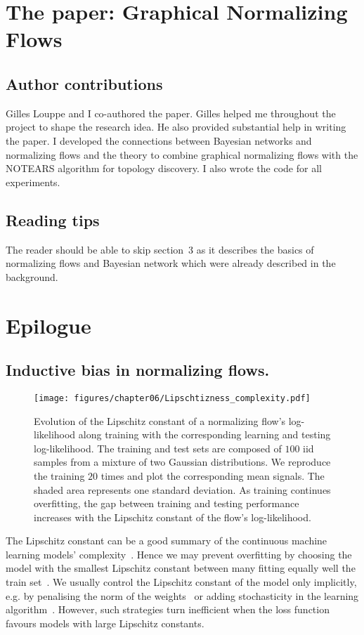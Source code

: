 \section{The paper: Graphical Normalizing Flows}
\subsection{Author contributions}
Gilles Louppe and I co-authored the paper. Gilles helped me throughout the project to shape the research idea. He also provided substantial help in writing the paper. I developed the connections between Bayesian networks and normalizing flows and the theory to combine graphical normalizing flows with the NOTEARS algorithm for topology discovery. I also wrote the code for all experiments.

\subsection{Reading tips}
The reader should be able to skip section~3 as it describes the basics of normalizing flows and Bayesian network which were already described in the background.



\section{Epilogue}

\subsection{Inductive bias in normalizing flows.}
\begin{figure}
  \centering
  \texttt{[image: figures/chapter06/Lipschtizness\_complexity.pdf]}
  \caption{Evolution of the Lipschitz constant of a normalizing flow's log-likelihood along training with the corresponding learning and testing log-likelihood. The training and test sets are composed of $100$ iid samples from a mixture of two Gaussian distributions. We reproduce the training $20$ times and plot the corresponding mean signals. The shaded area represents one standard deviation. As training continues overfitting, the gap between training and testing performance increases with the Lipschitz constant of the flow's log-likelihood.}
  \label{fig:flow_Lipschtizness}
\end{figure}
The Lipschitz constant can be a good summary of the continuous machine learning models' complexity~\citep{virmaux2018lipschitz, weng2018evaluating, bartlett2017spectrally}. Hence we may prevent overfitting by choosing the model with the smallest Lipschitz constant between many fitting equally well the train set~\citep{von2004distance}. We usually control the Lipschitz constant of the model only implicitly, e.g. by penalising the norm of the weights~\citep{krogh1991simple} or adding stochasticity in the learning algorithm~\citep{smith2021origin, bottou2012stochastic}. However, such strategies turn inefficient when the loss function favours models with large Lipschitz constants.

